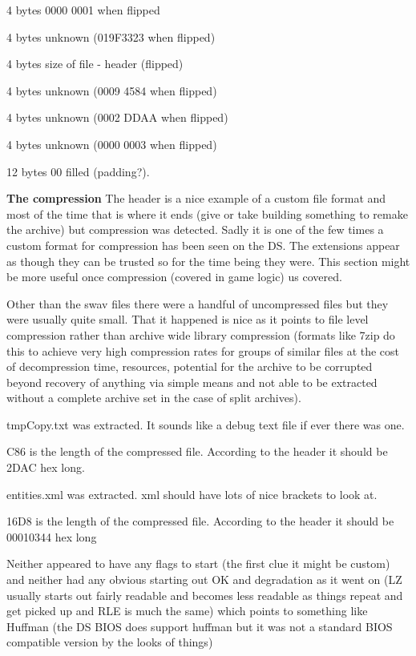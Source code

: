 \documentclass[
]{book}
\begin{document}
4 bytes 0000 0001 when flipped

4 bytes unknown (019F3323 when flipped)

4 bytes size of file - header (flipped)

4 bytes unknown (0009 4584 when flipped)

4 bytes unknown (0002 DDAA when flipped)

4 bytes unknown (0000 0003 when flipped)

12 bytes 00 filled (padding?).

\textbf{The compression} The header is a nice example of a custom file format and most of the time that is where it ends (give or take building something to remake the archive) but compression was detected. Sadly it is one of the few times a custom format for compression has been seen on the DS. The extensions appear as though they can be trusted so for the time being they were. This section might be more useful once compression (covered in game logic) us covered.

Other than the swav files there were a handful of uncompressed files but they were usually quite small. That it happened is nice as it points to file level compression rather than archive wide library compression (formats like 7zip do this to achieve very high compression rates for groups of similar files at the cost of decompression time, resources, potential for the archive to be corrupted beyond recovery of anything via simple means and not able to be extracted without a complete archive set in the case of split archives).

tmpCopy.txt was extracted. It sounds like a debug text file if ever there was one.

C86 is the length of the compressed file. According to the header it should be 2DAC hex long.

entities.xml was extracted. xml should have lots of nice brackets to look at.

16D8 is the length of the compressed file. According to the header it should be 00010344 hex long

Neither appeared to have any flags to start (the first clue it might be custom) and neither had any obvious starting out OK and degradation as it went on (LZ usually starts out fairly readable and becomes less readable as things repeat and get picked up and RLE is much the same) which points to something like Huffman (the DS BIOS does support huffman but it was not a standard BIOS compatible version by the looks of things)
\end{document}
